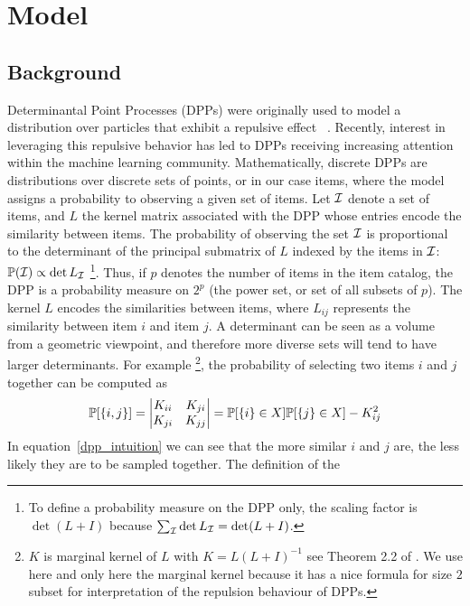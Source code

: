 \section{Model}
\label{sec:model}
\subsection{Background}
Determinantal Point Processes (DPPs) were originally used  to model a distribution over particles that
exhibit a repulsive effect ~\cite{Vershik2001book}. Recently, interest in leveraging this repulsive
behavior has led to DPPs receiving increasing attention within the machine
learning community.  Mathematically,
discrete DPPs are distributions over discrete sets of points, or in our case
items, where the model assigns a probability to observing a given set of items. Let $\mathcal{I}$ denote a
set of items, and $L$ the kernel matrix associated with the DPP whose entries
encode the similarity between items. The probability of observing the set
$\mathcal{I}$ is proportional to the determinant of the principal submatrix of $L$
indexed by the items in $\mathcal{I}$: $\mathbb{P}(\mathcal{I}) \propto \det L_{\mathcal{I}}$ \footnote{To define a probability measure on the DPP only, the scaling factor is $\det(L + I)$ because $\sum_{\mathcal{I}} \det L_{\mathcal{I}} = \det (L+I)$.}.
Thus, if $p$ denotes the number of items in the item catalog, the DPP is a probability measure on
$2^p$ (the power set, or set of all subsets of $p$). The kernel $L$ encodes the
similarities between items, where $L_{ij}$ represents the similarity between item
$i$ and item $j$.
A determinant can be seen as a volume from a geometric viewpoint, and therefore more diverse sets 
will tend to have larger determinants.
For example \footnote{$K$ is marginal kernel of $L$ with $K=L(L+I)^{-1}$ see Theorem 2.2 of \cite{Kulesza:2012:DPP:2481023}. We use here and only here the marginal kernel because it has a nice formula for size $2$ subset for interpretation of the repulsion behaviour of DPPs.}, the probability of selecting two items $i$ and $j$ together can be computed as
\begin{eqnarray}
\label{dpp_intuition}
\mathbb{P}[\{i,j\}] = \begin{vmatrix}
K_{ii} & K_{ji} \\ K_{ji} & K_{jj} 
\end{vmatrix} = \mathbb{P}[\{i\} \in X] \mathbb{P}[\{j\} \in X]-K_{ij}^2
\end{eqnarray}
In equation~\ref{dpp_intuition} we can see that the more similar $i$ and $j$
are, the less likely they are to be sampled together. The definition of the
